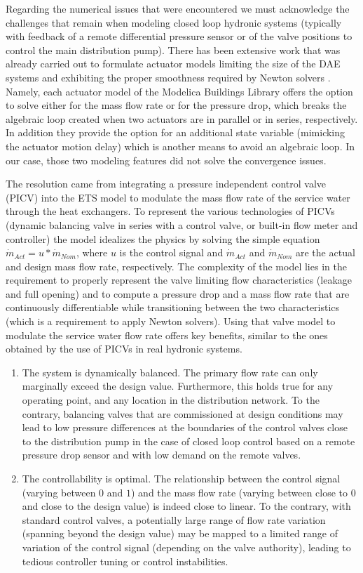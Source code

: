 \begin{appendix}
Regarding the numerical issues that were encountered we must acknowledge the challenges that remain when modeling closed loop hydronic systems (typically with feedback of a remote differential pressure sensor or of the valve positions to control the main distribution pump).
There has been extensive work that was already carried out to formulate actuator models limiting the size of the DAE systems and exhibiting the proper smoothness required by Newton solvers \citep{Jorissen2015}.
Namely, each actuator model of the Modelica Buildings Library offers the option to solve either for the mass flow rate or for the pressure drop, which breaks the algebraic loop created when two actuators are in parallel or in series, respectively. In addition they provide the option for an additional state variable (mimicking the actuator motion delay) which is another means to avoid an algebraic loop.
In our case, those two modeling features did not solve the convergence issues.

The resolution came from integrating a pressure independent control valve (PICV) into the ETS model to modulate the mass flow rate of the service water through the heat exchangers.
To represent the various technologies of PICVs (dynamic balancing valve in series with a control valve, or built-in flow meter and controller) the model idealizes the physics by solving the simple equation $ \dot{m}_{Act} = u * \dot{m}_{Nom} $, where $u$ is the control signal and $\dot{m}_{Act}$ and $\dot{m}_{Nom}$ are the actual and design mass flow rate, respectively.
The complexity of the model lies in the requirement to properly represent the valve limiting flow characteristics (leakage and full opening) and to compute a pressure drop and a mass flow rate that are continuously differentiable while transitioning between the two characteristics (which is a requirement to apply Newton solvers).
Using that valve model to modulate the service water flow rate offers  key benefits, similar to the ones obtained by the use of PICVs in real hydronic systems.
\begin{enumerate}
    \item The system is dynamically balanced. The primary flow rate can only marginally exceed the design value. Furthermore, this holds true for any operating point, and any location in the distribution network. To the contrary, balancing valves that are commissioned at design conditions may lead to low pressure differences at the boundaries of the control valves close to the distribution pump in the case of closed loop control based on a remote pressure drop sensor and with low demand on the remote valves.
    \item The controllability is optimal. The relationship between the control signal (varying between $0$ and $1$) and the mass flow rate (varying between close to $0$ and close to the design value) is indeed close to linear. To the contrary, with standard control valves, a potentially large range of flow rate variation (spanning beyond the design value) may be mapped to a limited range of variation of the control signal (depending on the valve authority), leading to tedious controller tuning or control instabilities.
\end{enumerate}


\end{appendix}

